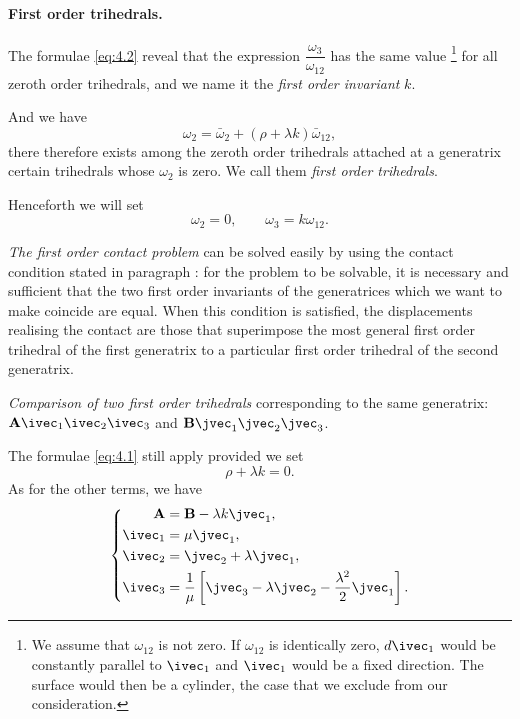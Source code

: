 \paragraph{First order trihedrals.}
\label{sec:50}
The formulae \eqref{eq:4.2} reveal that the expression $\dfrac{\omega_{3}}{\omega_{12}}$ has the same value \footnote{We assume that $\omega_{12}$ is not zero. If $\omega_{12}$ is identically zero, $d\ivec_{1}$ would be constantly parallel to $\ivec_{1}$ and $\ivec_{1}$ would be a fixed direction. The surface would then be a cylinder, the case that we exclude from our consideration.} for all zeroth order trihedrals, and we name it the \emph{first order invariant} $k$.

And we have
\[
\omega_{2}=\bar\omega_{2}+(\rho+\lambda k)\bar\omega_{12},
\]
there therefore exists among the zeroth order trihedrals attached at a generatrix certain trihedrals whose $\omega_{2}$ is zero. We call them \emph{first order trihedrals}.

Henceforth we will set
\begin{equation}
  \label{eq:4.3}
  \omega_{2}=0,\qquad\omega_{3}=k\omega_{12}.
\end{equation}

\emph{The first order contact problem} can be solved easily by using the contact condition stated in paragraph : for the problem to be solvable, it is necessary and sufficient that the two first order invariants of the generatrices which we want to make coincide are equal. When this condition is satisfied, the displacements realising the contact are those that superimpose the most general first order trihedral of the first generatrix to a particular first order trihedral of the second generatrix.

\emph{Comparison of two first order trihedrals} corresponding to the same generatrix: $\mathbf{A}\ivec_{1}\ivec_{2}\ivec_{3}$ and $\mathbf{B}\jvec_{1}\jvec_{2}\jvec_{3}$.

The formulae \eqref{eq:4.1} still apply provided we set
\[
\rho+\lambda k=0.
\]
As for the other terms, we have
\begin{equation}
  \label{eq:4.4}
  \left\{
    \begin{aligned}
      \mathbf{A}&=\mathbf{B}-\lambda k\jvec_{1},\\
      \ivec_{1}&=\mu\jvec_{1},\\
      \ivec_{2}&=\jvec_{2}+\lambda\jvec_{1},\\
      \ivec_{3}&=\frac{1}{\mu}\left[\jvec_{3}-\lambda\jvec_{2}-\frac{\lambda^{2}}{2}\jvec_{1}\right].
    \end{aligned}
  \right.
\end{equation}

